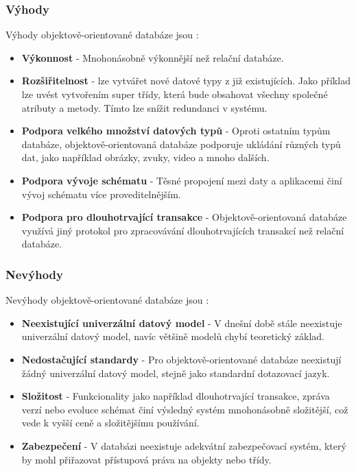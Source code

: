 \subsubsection{Výhody}
Výhody objektově-orientované databáze jsou \cite{advantages_oo}:
\begin{itemize}
\item \textbf{Výkonnost} - Mnohonásobně výkonnější než relační databáze.
\item \textbf{Rozšiřitelnost} - lze vytvářet nové datové typy z již existujících. Jako příklad lze uvést vytvořením super třídy, která bude obsahovat všechny společné atributy a metody. Tímto lze snížit redundanci v systému.
\item \textbf{Podpora velkého množství datových typů} - Oproti ostatním typům databáze, objektově-orientovaná databáze podporuje ukládání různých typů dat, jako například obrázky, zvuky, video a mnoho dalších.
\item \textbf{Podpora vývoje schématu} - Těsné propojení mezi daty a aplikacemi činí vývoj schématu více proveditelnějším.
\item \textbf{Podpora pro dlouhotrvající transakce} - Objektově-orientovaná databáze využívá jiný protokol pro zpracovávání dlouhotrvajících transakcí než relační databáze.
\end{itemize}
\newpage
\subsubsection{Nevýhody}
Nevýhody objektově-orientované databáze jsou \cite{advantages_oo}:
\begin{itemize}
\item \textbf{Neexistující univerzální datový model} - V dnešní době stále neexistuje univerzální datový model, navíc většině modelů chybí teoretický základ.
\item \textbf{Nedostačující standardy} - Pro objektově-orientované databáze neexistují žádný univerzální datový model, stejně jako standardní dotazovací jazyk.
\item \textbf{Složitost} - Funkcionality jako například dlouhotrvající transakce, zpráva verzí nebo evoluce schémat činí výsledný systém mnohonásobně složitější, což vede k vyšší ceně a složitějšímu používání.
\item \textbf{Zabezpečení} - V databázi neexistuje adekvátní zabezpečovací systém, který by mohl přiřazovat přístupová práva na objekty nebo třídy.
\end{itemize}

